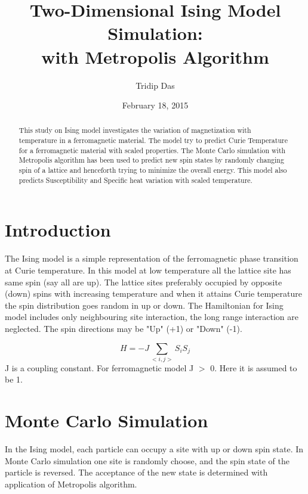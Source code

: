 \documentclass[]{article}
\begin{document}
\title{Two-Dimensional Ising Model Simulation:\\with Metropolis Algorithm}%
\author{Tridip Das}
\date{February 18, 2015}%
\maketitle

\begin{abstract}
This study on Ising model investigates the variation of magnetization with temperature in a ferromagnetic material.
The model try to predict Curie Temperature for a ferromagnetic material with scaled properties. The Monte Carlo simulation with Metropolis algorithm has been
used to predict new spin states by randomly changing spin of a lattice and henceforth trying to minimize the overall energy.
This model also predicts Susceptibility and Specific heat variation with scaled temperature.
\end{abstract}

\section{Introduction} %
\label{sec:level1} %

The Ising model is a simple representation of the ferromagnetic phase transition at Curie temperature. In this model at low temperature all the lattice site has same spin (say all are up).
The lattice sites preferably occupied by opposite (down) spins with increasing temperature and when it attains Curie temperature the spin distribution goes random in up or down.
The Hamiltonian for Ising model includes only neighbouring site interaction, the long range interaction are neglected. The spin directions may be "Up" (+1) or "Down" (-1).

\begin{equation}
\label{eq:one} %
  H = - J \sum_{<i,j>} S_i S_j
\end{equation}
J is a coupling constant. For ferromagnetic model J $>$ 0. Here it is assumed to be 1.

\section{Monte Carlo Simulation}
In the Ising model, each particle can occupy a site with up or down spin state. In Monte Carlo simulation one site is randomly choose, and the spin state of the particle is reversed.
The acceptance of the new state is determined with application of Metropolis algorithm.
\end{document}
